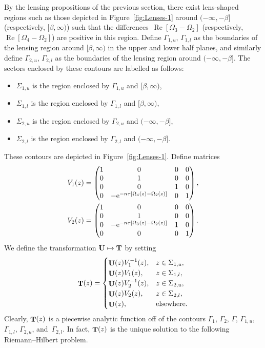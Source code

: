 \documentclass[pdftex]{sigma}
\DeclareMathOperator{\TT}{{\bf T}}
\DeclareMathOperator{\UU}{{\bf U}}
\numberwithin{equation}{section}
\begin{document}
By the lensing propositions of the previous section, there exist lens-shaped regions such as those depicted in Figure~\ref{fig:Lenses-1} around $(-\infty,-\beta]$ (respectively, $[\beta,\infty)$) such that the differences~${\operatorname{Re}[\Omega_3-\Omega_2]}$ (respectively, $\operatorname{Re}[\Omega_4-\Omega_2]$) are positive in this region. Define $\Gamma_{1,u}$, $\Gamma_{1,l}$ as the boundaries of the lensing region around $[\beta,\infty)$ in the upper and lower half planes, and similarly define $\Gamma_{2,u}$, $\Gamma_{2,l}$ as the boundaries of the lensing region around $(-\infty,-\beta]$.
The sectors enclosed by these contours are labelled as follows:
 \begin{itemize}\itemsep=0pt
 \item $\Sigma_{1,u}$ is the region enclosed by $\Gamma_{1,u}$ and $[\beta,\infty)$,
 \item $\Sigma_{1,l}$ is the region enclosed by $\Gamma_{1,l}$ and $[\beta,\infty)$,
 \item $\Sigma_{2,u}$ is the region enclosed by $\Gamma_{2,u}$ and $(-\infty,-\beta]$,
 \item $\Sigma_{2,l}$ is the region enclosed by $\Gamma_{2,l}$ and $(-\infty,-\beta]$.
 \end{itemize}
These contours are depicted in Figure~\ref{fig:Lenses-1}. Define matrices
 \begin{gather*}
 V_1(z) =
 \begin{pmatrix}
 1 & 0 & 0 & 0\\
 0 & 1 & 0 & 0\\
 0 & 0 & 1 & 0\\
 0 & -{\rm e}^{-n\tau[\Omega_4(z) - \Omega_2(z)]} & 0 & 1
 \end{pmatrix}, \\
 V_2(z) =
 \begin{pmatrix}
 1 & 0 & 0 & 0\\
 0 & 1 & 0 & 0\\
 0 & -{\rm e}^{-n\tau[\Omega_3(z) - \Omega_2(z)]} & 1 & 0\\
 0 & 0 & 0 & 1
 \end{pmatrix}.
 \end{gather*}
We define the transformation ${\bf U} \mapsto {\bf T}$ by setting
 \begin{equation*}
 \TT(z) =
 \begin{cases}
 \UU(z) V_1^{-1}(z), & z \in \Sigma_{1,u},\\
 \UU(z) V_1(z), & z \in \Sigma_{1,l},\\
 \UU(z) V_2^{-1}(z), & z \in \Sigma_{2,u},\\
 \UU(z) V_2(z), & z \in \Sigma_{2,l},\\
 \UU(z), & \text{elsewhere}.
 \end{cases}
 \end{equation*}
Clearly, $\TT(z)$ is a piecewise analytic function off of the contours $\Gamma_1$, $\Gamma_2$, $\Gamma$, $\Gamma_{1,u}$, $\Gamma_{1,l}$, $\Gamma_{2,u}$,
and~$\Gamma_{2,l}$. In fact, $\TT(z)$ is the unique solution to the following Riemann--Hilbert problem.
\end{document}
